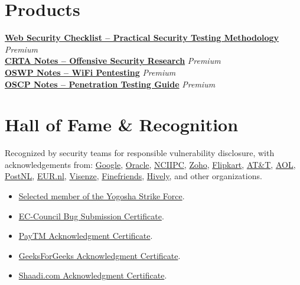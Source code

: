 \documentclass[10pt,a4paper]{article}
\newcommand{\project}[2]{
    \textbf{#1} \hfill \textit{#2}\\[-2pt]
}
\begin{document}
\section{Products}

\project{\href{https://zishanhack.com}{Web Security Checklist -- Practical Security Testing Methodology}}{Premium}
\project{\href{https://zishanhack.com}{CRTA Notes -- Offensive Security Research}}{Premium}
\project{\href{https://zishanhack.com}{OSWP Notes -- WiFi Pentesting}}{Premium}
\project{\href{https://zishanhack.com}{OSCP Notes -- Penetration Testing Guide}}{Premium}

\section{Hall of Fame \& Recognition}

Recognized by security teams for responsible vulnerability disclosure, with acknowledgements from:
\href{https://bughunters.google.com/leaderboard/honorable-mentions}{Google},
\href{https://www.oracle.com/security-alerts/cpuapr2018.html}{Oracle},
\href{https://nciipc.gov.in/documents/NCIIPC_Newsletter_Oct19.pdf}{NCIIPC},
\href{https://bugbounty.zohocorp.com/bb/info#hof}{Zoho},
\href{https://hackerone.com/flipkart}{Flipkart},
\href{https://hackerone.com/att}{AT\&T},
\href{https://web.archive.org/web/20191231125749/https://contact.security.aol.com/hof/}{AOL},
\href{https://www.postnl.nl/en/responsible-disclosure/}{PostNL},
\href{https://www.eur.nl/en/campus/locations/campus-woudestein/security-safety/information-security/hall-fame}{EUR.nl},
\href{https://www.visenze.com/hall-of-fame/}{Visenze},
\href{https://finefriends.social/security/hof}{Finefriends},
\href{https://support.teamhively.com/general-use/i-found-a-bug-what-should-i-do/}{Hively},
and other organizations.

\begin{itemize}
    \item \href{https://app.yogosha.com/r/ZishanAdThandar}{Selected member of the Yogosha Strike Force}.
    \item \href{https://zishanhack.com/about/img/CERT/eccouncil1.jpg}{EC-Council Bug Submission Certificate}.
    \item \href{https://zishanhack.com/about/img/CERT/paytm.jpg}{PayTM Acknowledgment Certificate}.
    \item \href{https://web.archive.org/web/20220521173955/https://www.geeksforgeeks.org/certificates/?hof=1}{GeeksForGeeks Acknowledgment Certificate}.
    \item \href{https://zishanhack.com/about/img/CERT/shaadi.jpg}{Shaadi.com Acknowledgment Certificate}.
\end{itemize}
\end{document}
